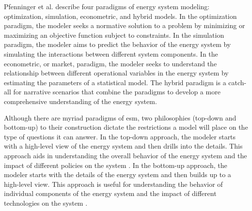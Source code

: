 Pfenninger et al. \cite{pfenninger_energy_2014} describe four
paradigms of energy system modeling: optimization, simulation, econometric, and
hybrid models. In the optimization paradigm, the modeler seeks a normative
solution to a problem by minimizing or maximizing an objective function subject
to constraints. In the simulation paradigm, the modeler aims to predict the
behavior of the energy system by simulating the interactions between different
system components. In the econometric, or market, paradigm, the modeler seeks
to understand the relationship between different operational variables in the
energy system by estimating the parameters of a statistical model. The hybrid
paradigm is a catch-all for narrative scenarios that combine the paradigms to
develop a more comprehensive understanding of the energy system.

Although there are myriad paradigms of \gls{esm}, two philosophies (top-down
and bottom-up) to their construction dictate the restrictions a model will
place on the type of questions it can answer. In the top-down approach, the
modeler starts with a high-level view of the energy system and then drills into
the details. This approach aids in understanding the overall behavior of the
energy system and the impact of different policies on the system
\cite{laha_energy_2017}. In the bottom-up approach, the modeler starts with the
details of the energy system and then builds up to a high-level view. This
approach is useful for understanding the behavior of individual components of
the energy system and the impact of different technologies on the system
\cite{ipcc_ch2_2000,laha_energy_2017}.

